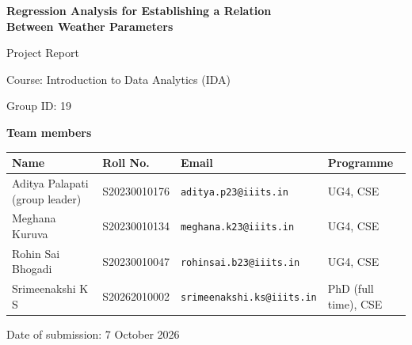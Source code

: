 \documentclass[11pt,a4paper]{article}
\newcommand{\submissiondate}{7 October 2026}   %
\begin{document}
\begin{titlepage}
  \centering
  \vspace*{2cm}
  {\LARGE\bfseries Regression Analysis for Establishing a Relation\\[0.3em]
   Between Weather Parameters\par}
  \vspace{1.2cm}
  {\large Project Report\par}
  \vspace{0.4cm}
  {\large Course: Introduction to Data Analytics (IDA)\par}
  \vspace{0.3cm}
  {\large Group ID: 19\par}
  \vspace{1.5cm}

  {\large\bfseries Team members\par}
  \vspace{0.3cm}
  {\small
  \begin{tabular}{llll}
    \toprule
    Name & Roll No. & Email & Programme \\
    \midrule
    Aditya Palapati (group leader) & S20230010176 & \texttt{aditya.p23@iiits.in}      & UG4, CSE \\
    Meghana Kuruva                 & S20230010134 & \texttt{meghana.k23@iiits.in}     & UG4, CSE \\
    Rohin Sai Bhogadi               & S20230010047 & \texttt{rohinsai.b23@iiits.in}    & UG4, CSE \\
    Srimeenakshi K S               & S20262010002 & \texttt{srimeenakshi.ks@iiits.in} & PhD (full time), CSE \\
    \bottomrule
  \end{tabular}}

  \vfill
  {\large Date of submission: \submissiondate\par}
\end{titlepage}
\end{document}
